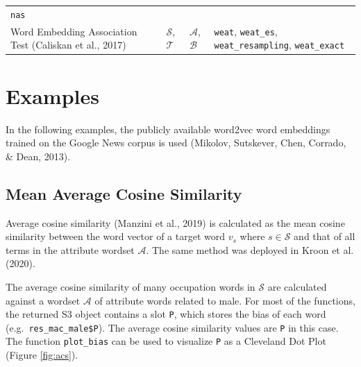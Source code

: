 \documentclass[english,man,mask]{apa6}
\begin{document}
\begin{longtable}[]{@{}llll@{}}
\begin{minipage}[t]{0.27\columnwidth}
\texttt{nas}\strut
\end{minipage}\tabularnewline
\begin{minipage}[t]{0.30\columnwidth}\raggedright
Word Embedding Association Test (Caliskan et al., 2017)\strut
\end{minipage} & \begin{minipage}[t]{0.16\columnwidth}\raggedright
\(\mathcal{S}\), \(\mathcal{T}\)\strut
\end{minipage} & \begin{minipage}[t]{0.16\columnwidth}\raggedright
\(\mathcal{A}\), \(\mathcal{B}\)\strut
\end{minipage} & \begin{minipage}[t]{0.27\columnwidth}\raggedright
\texttt{weat}, \texttt{weat\_es}, \texttt{weat\_resampling}, \texttt{weat\_exact}\strut
\end{minipage}\tabularnewline
\bottomrule
\end{longtable}

\hypertarget{examples}{%
\section{Examples}\label{examples}}

In the following examples, the publicly available word2vec word embeddings trained on the Google News corpus is used (Mikolov, Sutskever, Chen, Corrado, \& Dean, 2013).

\hypertarget{mean-average-cosine-similarity}{%
\subsection{Mean Average Cosine Similarity}\label{mean-average-cosine-similarity}}

Average cosine similarity (Manzini et al., 2019) is calculated as the mean cosine similarity between the word vector of a target word \(v_s\) where \(s \in \mathcal{S}\) and that of all terms in the attribute wordset \({\mathcal{A}}\). The same method was deployed in Kroon et al. (2020).

The average cosine similarity of many occupation words in \(\mathcal{S}\) are calculated against a wordset \(\mathcal{A}\) of attribute words related to male. For most of the functions, the returned S3 object contains a slot \texttt{P}, which stores the bias of each word (e.g.~\texttt{res\_mac\_male\$P}). The average cosine similarity values are \texttt{P} in this case. The function \texttt{plot\_bias} can be used to visualize \texttt{P} as a Cleveland Dot Plot (Figure \ref{fig:acs}).
\end{document}
